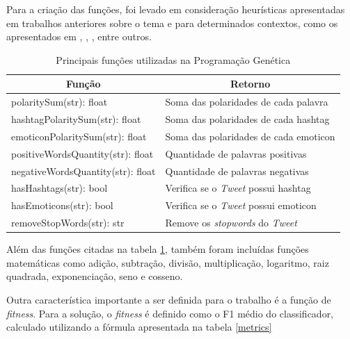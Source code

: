 \documentclass[12pt]{article}
\begin{document}
Para a criação das funções, foi levado em consideração heurísticas apresentadas em trabalhos anteriores sobre o tema e para determinados contextos, como os apresentados em \cite{araujo2013metodos}, \cite{Rodrigues2016}, \cite{Turney2002}, entre outros.

\begin{table}[H]
	\centering
	\begin{tabular}{ll}
	\multicolumn{1}{c}{\textbf{Função}} & \multicolumn{1}{c}{\textbf{Retorno}} \\
	\hline
	polaritySum(str): float & Soma das polaridades de cada palavra  \\
	\hline
	hashtagPolaritySum(str): float & Soma das polaridades de cada hashtag \\
	\hline
	emoticonPolaritySum(str): float & Soma das polaridades de cada emoticon  \\
	\hline
	positiveWordsQuantity(str): float & Quantidade de palavras positivas \\
	\hline
	negativeWordsQuantity(str): float & Quantidade de palavras negativas \\
	\hline
	hasHashtags(str): bool & Verifica se o \emph{Tweet} possui hashtag \\
	\hline
	hasEmoticons(str): bool & Verifica se o \emph{Tweet} possui emoticon \\
	\hline
	removeStopWords(str): str & Remove os \emph{stopwords} do \emph{Tweet} \\
	\hline
	\end{tabular}
	\caption{Principais funções utilizadas na Programação Genética}
	\label{tab_functions}
\end{table}

Além das funções citadas na tabela \ref{tab_functions}, também foram incluídas funções matemáticas como adição, subtração, divisão, multiplicação, logaritmo, raiz quadrada, exponenciação, seno e cosseno.

Outra característica importante a ser definida para o trabalho é a função de \emph{fitness}. Para a solução, o \emph{fitness} é definido como o F1 médio do classificador, calculado utilizando a fórmula apresentada na tabela \ref{metrics}
\end{document}
